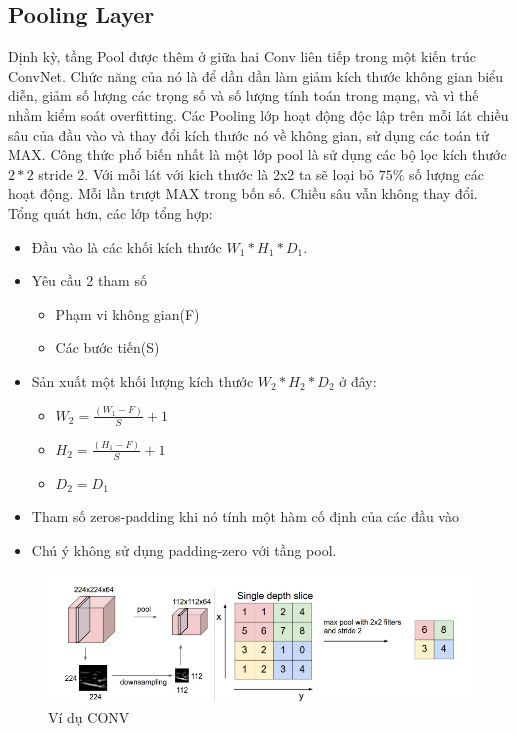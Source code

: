 \documentclass[a4paper,12pt]{report}
\begin{document}
\subsection{Pooling Layer}
Dịnh kỳ, tầng Pool được thêm ở giữa hai Conv liên tiếp trong một kiến trúc ConvNet. Chức năng của nó là để dần dần làm giảm kích thước không gian biểu diễn, giảm số lượng các trọng số và số lượng tính toán trong mạng, và vì thế nhằm kiểm soát overfitting. Các Pooling lớp hoạt động độc lập trên mỗi lát chiều sâu của đầu vào và thay đổi kích thước nó về không gian, sử dụng các toán tử MAX. Công thức phổ biến nhất là một lớp pool là sử dụng các bộ lọc kích thước $2*2$ stride 2. Với mỗi lát với kich thước là 2x2 ta sẽ loại bỏ $75\%$ số lượng các hoạt động.  Mỗi lần trượt MAX trong bốn số. Chiều sâu vẫn không thay đổi. Tổng quát hơn, các lớp tổng hợp:
\begin{itemize}
\item Đầu vào là các khối kích thước $W_1*H_1*D_1$.
\item Yêu cầu 2 tham số
\begin{itemize}
\item Phạm vi không gian(F)
\item Các bước tiến(S)
\end{itemize}
\item Sản xuất một khối lượng kích thước $W_2*H_2*D_2$ ở đây:
\begin{itemize}
\item $W_2 =\frac{(W_1 - F)}{S} + 1$
\item $H_2 =\frac{(H_1 - F)}{S} + 1$
\item $D_2 = D_1$
\end{itemize}
\item Tham số zeros-padding khi nó tính một hàm cố định của các đầu vào
\item Chú ý không sử dụng padding-zero với tầng pool.
\end{itemize}
\begin{center}
\begin{figure}[H]
\includegraphics[scale=0.8]{img4.png}
\caption{Ví dụ CONV}
\end{figure}
\end{center}
\end{document}
